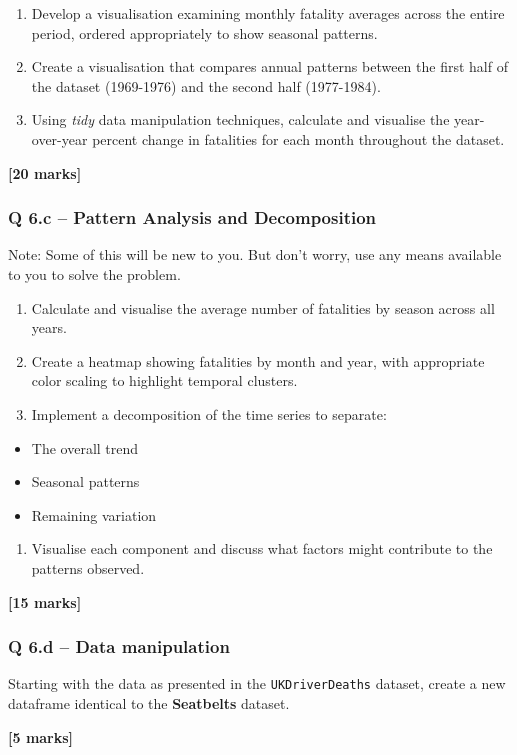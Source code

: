 \documentclass[
  10t,
]{article}
\providecommand{\tightlist}{%
  \setlength{\itemsep}{0pt}\setlength{\parskip}{0pt}}\usepackage{longtable,booktabs,array}
\begin{document}
\begin{enumerate}
\def\labelenumi{\roman{enumi}.}
\setcounter{enumi}{1}
\tightlist
\item
  Develop a visualisation examining monthly fatality averages across the
  entire period, ordered appropriately to show seasonal patterns.
\item
  Create a visualisation that compares annual patterns between the first
  half of the dataset (1969-1976) and the second half (1977-1984).
\item
  Using \emph{tidy} data manipulation techniques, calculate and
  visualise the year-over-year percent change in fatalities for each
  month throughout the dataset.
\end{enumerate}

\textbf{{[}20 marks{]}}

\subsubsection{Q 6.c -- Pattern Analysis and
Decomposition}\label{q-6.c-pattern-analysis-and-decomposition}

Note: Some of this will be new to you. But don't worry, use any means
available to you to solve the problem.

\begin{enumerate}
\def\labelenumi{\roman{enumi}.}
\tightlist
\item
  Calculate and visualise the average number of fatalities by season
  across all years.
\item
  Create a heatmap showing fatalities by month and year, with
  appropriate color scaling to highlight temporal clusters.
\item
  Implement a decomposition of the time series to separate:
\end{enumerate}

\begin{itemize}
\tightlist
\item
  The overall trend
\item
  Seasonal patterns
\item
  Remaining variation
\end{itemize}

\begin{enumerate}
\def\labelenumi{\roman{enumi}.}
\setcounter{enumi}{3}
\tightlist
\item
  Visualise each component and discuss what factors might contribute to
  the patterns observed.
\end{enumerate}

\textbf{{[}15 marks{]}}

\subsubsection{Q 6.d -- Data
manipulation}\label{q-6.d-data-manipulation}

Starting with the data as presented in the \texttt{UKDriverDeaths}
dataset, create a new dataframe identical to the \textbf{Seatbelts}
dataset.

\textbf{{[}5 marks{]}}
\end{document}

